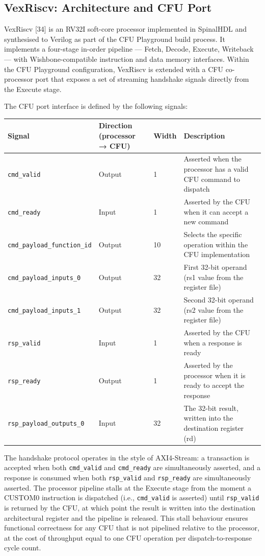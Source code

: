 \subsection{VexRiscv: Architecture and CFU Port}

VexRiscv [34] is an RV32I soft-core processor implemented in SpinalHDL and synthesised to Verilog as part of the CFU Playground build process. It implements a four-stage in-order pipeline — Fetch, Decode, Execute, Writeback — with Wishbone-compatible instruction and data memory interfaces. Within the CFU Playground configuration, VexRiscv is extended with a CFU co-processor port that exposes a set of streaming handshake signals directly from the Execute stage.

The CFU port interface is defined by the following signals:

\begin{table}[htbp]
\centering
\begin{tabularx}{\textwidth}{X X X X}
\toprule
Signal & Direction (processor → CFU) & Width & Description \\
\midrule
\texttt{cmd\_valid} & Output & 1 & Asserted when the processor has a valid CFU command to dispatch \\
\texttt{cmd\_ready} & Input & 1 & Asserted by the CFU when it can accept a new command \\
\texttt{cmd\_payload\_function\_id} & Output & 10 & Selects the specific operation within the CFU implementation \\
\texttt{cmd\_payload\_inputs\_0} & Output & 32 & First 32-bit operand (rs1 value from the register file) \\
\texttt{cmd\_payload\_inputs\_1} & Output & 32 & Second 32-bit operand (rs2 value from the register file) \\
\texttt{rsp\_valid} & Input & 1 & Asserted by the CFU when a response is ready \\
\texttt{rsp\_ready} & Output & 1 & Asserted by the processor when it is ready to accept the response \\
\texttt{rsp\_payload\_outputs\_0} & Input & 32 & The 32-bit result, written into the destination register (rd) \\
\bottomrule
\end{tabularx}
\end{table}

The handshake protocol operates in the style of AXI4-Stream: a transaction is accepted when both \texttt{cmd\_valid} and \texttt{cmd\_ready} are simultaneously asserted, and a response is consumed when both \texttt{rsp\_valid} and \texttt{rsp\_ready} are simultaneously asserted. The processor pipeline stalls at the Execute stage from the moment a CUSTOM0 instruction is dispatched (i.e., \texttt{cmd\_valid} is asserted) until \texttt{rsp\_valid} is returned by the CFU, at which point the result is written into the destination architectural register and the pipeline is released. This stall behaviour ensures functional correctness for any CFU that is not pipelined relative to the processor, at the cost of throughput equal to one CFU operation per dispatch-to-response cycle count.

